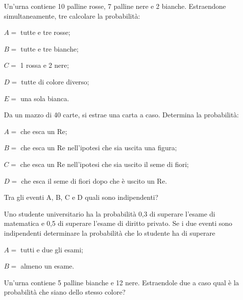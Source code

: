 \begin{esercizio}[\Ast]
 \label{ese:9.60}
 Un'urna contiene 10 palline rosse, 7 palline nere e 2 bianche. Estraendone simultaneamente, tre calcolare la probabilità:
\begin{itemize*}
 \item $ A= $ tutte e tre rosse;
 \item $ B= $ tutte e tre bianche;
 \item $ C= $ 1 rossa e 2 nere;
 \item $ D= $ tutte di colore diverso;
 \item $ E= $ una sola bianca.
\end{itemize*}
\end{esercizio}

\begin{esercizio}[\Ast]
 \label{ese:9.61}
 Da un mazzo di 40 carte, si estrae una carta a caso. Determina la probabilità:
\begin{itemize*}
\item $ A= $ che esca un Re;
\item $ B= $ che esca un Re nell'ipotesi che sia uscita una figura;
\item $ C= $ che esca un Re nell'ipotesi che sia uscito il seme di fiori;
\item $ D= $ che esca il seme di fiori dopo che è uscito un Re.
\end{itemize*}
Tra gli eventi A, B, C e D quali sono indipendenti?
\end{esercizio}

\begin{esercizio}[\Ast]
 \label{ese:9.62}
Uno studente universitario ha la probabilità 0,3 di superare l'esame di matematica e 0,5 di superare l'esame di diritto privato. Se i due eventi sono indipendenti determinare la probabilità che lo studente ha di superare
\begin{itemize*}
\item $ A= $ tutti e due gli esami;
\item $ B= $ almeno un esame.
\end{itemize*}
\end{esercizio}

\begin{esercizio}[\Ast]
 \label{ese:9.63}
Un'urna contiene 5 palline bianche e 12 nere. Estraendole due a caso qual è la probabilità che siano dello stesso colore?
\end{esercizio}

